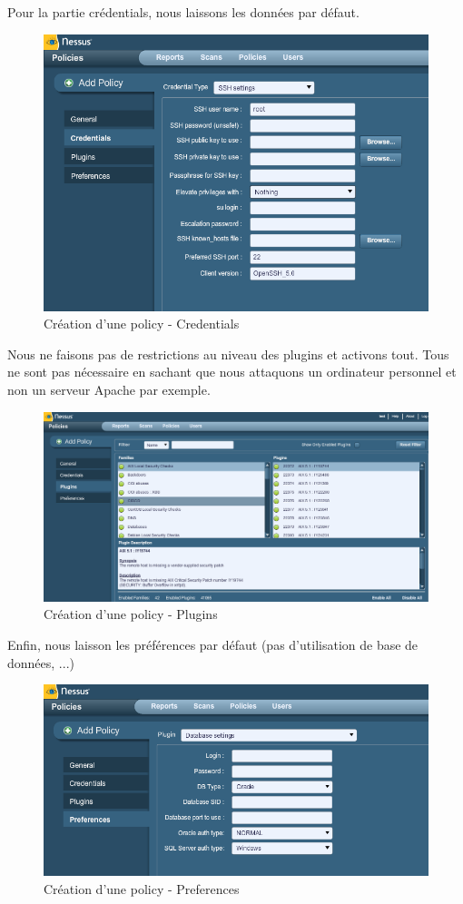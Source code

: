 \documentclass[a4paper,12pt]{article}
\begin{document}
Pour la partie crédentials, nous laissons les données par défaut.
\begin{figure}[H]
	\center
	\includegraphics[width=15cm]{img/nessus_policy_credentials.png}
	\caption{Création d'une policy - Credentials}
\end{figure}

Nous ne faisons pas de restrictions au niveau des plugins et activons tout. Tous ne sont pas nécessaire en sachant que nous attaquons un ordinateur
personnel et non un serveur Apache par exemple.
\begin{figure}[H]
	\center
	\includegraphics[width=15cm]{img/nessus_policy_plugins.png}
	\caption{Création d'une policy - Plugins}
\end{figure}

Enfin, nous laisson les préférences par défaut (pas d'utilisation de base de données, ...)
\begin{figure}[H]
	\center
	\includegraphics[width=15cm]{img/nessus_policy_preferences.png}
	\caption{Création d'une policy - Preferences}
\end{figure}
\end{document}
